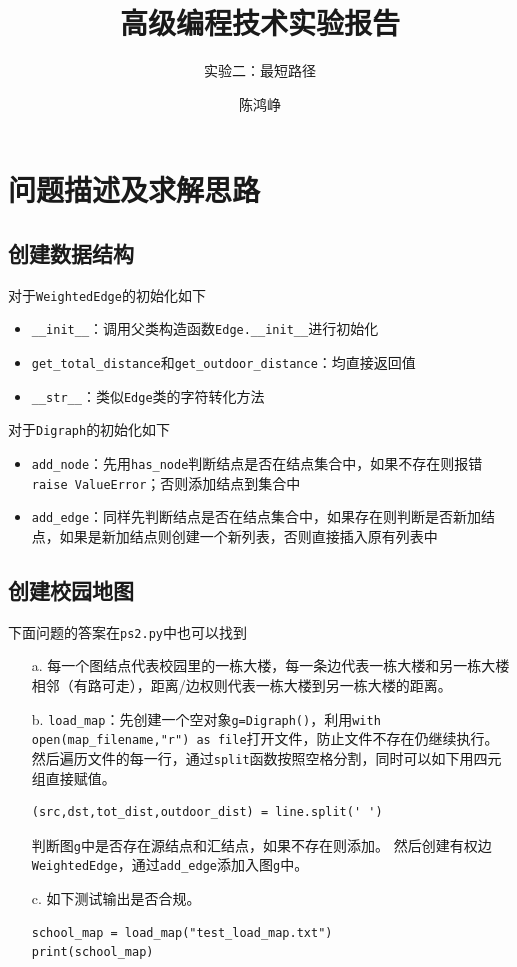 \documentclass[logo,reportComp]{thesis}
\title{高级编程技术实验报告}
\subtitle{实验二：最短路径}
\author{陈鸿峥}
\begin{document}
\maketitle

\section{问题描述及求解思路}
\subsection{创建数据结构}
对于\verb'WeightedEdge'的初始化如下
\begin{itemize}
    \item \verb'__init__'：调用父类构造函数\verb'Edge.__init__'进行初始化
    \item \verb'get_total_distance'和\verb'get_outdoor_distance'：均直接返回值
    \item \verb'__str__'：类似\verb'Edge'类的字符转化方法
\end{itemize}

对于\verb'Digraph'的初始化如下
\begin{itemize}
    \item \verb'add_node'：先用\verb'has_node'判断结点是否在结点集合中，如果不存在则报错\verb'raise ValueError'；否则添加结点到集合中
    \item \verb'add_edge'：同样先判断结点是否在结点集合中，如果存在则判断是否新加结点，如果是新加结点则创建一个新列表，否则直接插入原有列表中
\end{itemize}

\subsection{创建校园地图}
下面问题的答案在\verb'ps2.py'中也可以找到
\begin{itemize}
    \item [a.] 每一个图结点代表校园里的一栋大楼，每一条边代表一栋大楼和另一栋大楼相邻（有路可走），距离/边权则代表一栋大楼到另一栋大楼的距离。
    \item [b.] \verb'load_map'：先创建一个空对象\verb'g=Digraph()'，利用\verb'with open(map_filename,"r") as file'打开文件，防止文件不存在仍继续执行。
    然后遍历文件的每一行，通过\verb'split'函数按照空格分割，同时可以如下用四元组直接赋值。
\begin{lstlisting}
(src,dst,tot_dist,outdoor_dist) = line.split(' ')
\end{lstlisting}
    判断图\verb'g'中是否存在源结点和汇结点，如果不存在则添加。
    然后创建有权边\verb'WeightedEdge'，通过\verb'add_edge'添加入图\verb'g'中。
    \item [c.] 如下测试输出是否合规。
\begin{lstlisting}
school_map = load_map("test_load_map.txt")
print(school_map)
\end{lstlisting}
\end{itemize}
\end{document}
